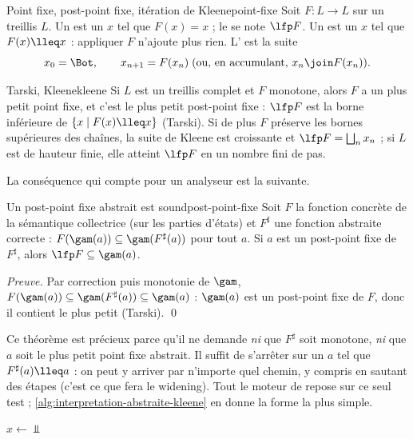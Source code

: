 \begin{definition}{Point fixe, post-point fixe, itération de Kleene}{point-fixe}
  Soit $F : L \to L$ sur un treillis $L$. Un  est un $x$ tel
  que $F(x) = x$ ; le  se note $\lfp F$. Un
   est un $x$ tel que $F(x) \lleq x$ : appliquer $F$
  n'ajoute plus rien. L' est la suite
  \[ x_0 = \Bot, \qquad x_{n+1} = F(x_n) \;(\text{ou, en accumulant, } x_n \join F(x_n)). \]
\end{definition}

\begin{theoreme}{Tarski, Kleene}{kleene}
  Si $L$ est un treillis complet et $F$ monotone, alors $F$ a un plus petit
  point fixe, et c'est le plus petit post-point fixe :
  $\lfp F$ est la borne inférieure de $\{ x \mid F(x) \lleq x \}$ (Tarski). Si de plus $F$
  préserve les bornes supérieures des chaînes, la suite de Kleene est
  croissante et $\lfp F = \bigsqcup_{n} x_n$ ; si $L$ est de hauteur finie,
  elle atteint $\lfp F$ en un nombre fini de pas.
\end{theoreme}

La conséquence qui compte pour un analyseur est la suivante.

\begin{theoreme}{Un post-point fixe abstrait est sound}{post-point-fixe}
  Soit $F$ la fonction concrète de la sémantique collectrice (sur les parties
  d'états) et $F^\sharp$ une fonction abstraite correcte :
  $F(\gam(a)) \subseteq \gam(F^\sharp(a))$ pour tout $a$. Si $a$ est un
  post-point fixe de $F^\sharp$, alors $\lfp F \subseteq \gam(a)$.
\end{theoreme}

\noindent\emph{Preuve.} Par correction puis monotonie de $\gam$,
$F(\gam(a)) \subseteq \gam(F^\sharp(a)) \subseteq \gam(a)$ : $\gam(a)$ est un
post-point fixe de $F$, donc il contient le plus petit (Tarski). \qed

Ce théorème est précieux parce qu'il ne demande \emph{ni} que $F^\sharp$ soit
monotone, \emph{ni} que $a$ soit le plus petit point fixe abstrait. Il suffit
de s'arrêter sur un $a$ tel que $F^\sharp(a) \lleq a$ : on peut y arriver par
n'importe quel chemin, y compris en sautant des étapes (c'est ce que fera le
widening). Tout le moteur de \reactant{} repose sur ce seul test ;
\cref{alg:interpretation-abstraite-kleene} en donne la forme la plus simple.

\begin{algorithm}[htbp]
$x \gets \Bot$\;
\caption{Itération de Kleene (forme accumulante)}
\label{alg:interpretation-abstraite-kleene}
\end{algorithm}

